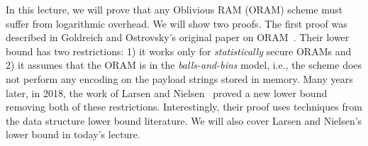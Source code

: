 
\newcommand{\bits}{\{0,1\}}
\newcommand{\bfu}{\mathbf{u}}
\newcommand{\bfv}{\mathbf{v}}
\newcommand{\bfp}{\mathbf{p}}
\newcommand{\bfz}{\mathbf{z}}
\newcommand{\bfx}{\mathbf{x}}
\newcommand{\bfy}{\mathbf{y}}

\newcommand{\calR}{\mathcal{R}}

\newcommand{\CNextMsg}{\ensuremath{{\sf C Next Msg}}}
\newcommand{\SNextMsg}{\ensuremath{{\sf S Next Msg}}}
\newcommand{\CNext}{\ensuremath{{\sf C Next}}}
\newcommand{\SNext}{\ensuremath{{\sf S Next}}}
\newcommand{\Cstp}{\ensuremath{{\sf Cst'}}}
\newcommand{\Cst}{\ensuremath{{\sf Cst}}}
\newcommand{\msg}{\ensuremath{{\sf msg}}}
\newcommand{\msgp}{\ensuremath{{\sf msg'}}}
\newcommand{\Coutput}{\ensuremath{{\sf Reconstr}}}
\newcommand{\ans}{\ensuremath{{\sf ans}}}
\newcommand{\Ccoins}{\ensuremath{{\sf Ccoins}}}
\newcommand{\Scoins}{\ensuremath{{\sf Scoins}}}
\newcommand{\Expt}{\ensuremath{{\sf Expt}}}
\newcommand{\coin}{\ensuremath{{\sf coin}}}
\newcommand{\View}{\ensuremath{{\sf View}}}
\newcommand{\PPT}{PPT }
\newcommand{\Out}{\ensuremath{{\sf Out}}}
\newcommand{\OWF}{\ensuremath{{\sf OWF}}}
\newcommand{\OT}{\ensuremath{{\sf OT}}}
\newcommand{\PIR}{\ensuremath{{\sf PIR}}}
\newcommand{\Server}{\ensuremath{{\sf Server}}}
\newcommand{\Client}{\ensuremath{{\sf Client}}}
\newcommand{\Alice}{\ensuremath{{\sf Alice}}}
\newcommand{\Bob}{\ensuremath{{\sf Bob}}}
\newcommand{\get}{\ensuremath{\leftarrow}}
\newcommand{\E}{\ensuremath{{\bf E}}}
\newcommand{\out}{\ensuremath{{\sf out}}}
\newcommand{\addr}{\vec{\mbox{addr}}}
\newcommand{\action}{\vec{\mbox{action}}}
\newcommand{\op}{\vec{\mbox{op}}}
\newcommand{\mread}{\mbox{read}}
\newcommand{\mwrite}{\mbox{write}}

\newcommand{\red}[1]{{}\color{red}#1}


In this lecture, we will prove that any Oblivious RAM (ORAM)
scheme must suffer from logarithmic overhead. 
We will show two proofs.  The first
proof was 
described in Goldreich and Ostrovsky's original paper on 
ORAM~\cite{goldreich96software}. 
Their lower bound has two restrictions: 
1) it works only for {\it statistically} secure ORAMs and 
2) 
it assumes that the ORAM is in the {\it balls-and-bins}
model, i.e., the scheme does not perform
any encoding on the payload strings stored in memory.
Many years later, in 2018, the 
work of Larsen and Nielsen~\cite{larsen18lowerbound}
proved a new lower bound removing both of these restrictions. 
Interestingly, their proof uses techniques
from the data structure lower bound literature.
We will also 
cover Larsen and Nielsen's lower bound in today's lecture.




